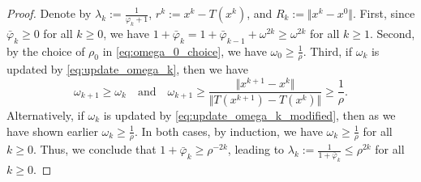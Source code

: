 \documentclass{article}
\theoremstyle{plain}
\theoremstyle{definition}
\newcommand{\norms}[1]{\Vert#1\Vert}
\newcommand{\0}{\boldsymbol{0}}
\begin{document}
\begin{proof}
Denote by $\lambda_k := \frac{1}{\varphi_k + 1}$, $r^k := x^k - T(x^k)$, and $R_k := \norms{x^k - x^0}$.
First, since $\bar{\varphi}_k \geq 0$ for all $k \geq 0$, we have $1 + \bar{\varphi}_k = 1 + \bar{\varphi}_{k-1} + \omega^{2k} \geq \omega^{2k}$ for all $k \geq 1$.
Second, by the choice of $\rho_0$ in \eqref{eq:omega_0_choice}, we have $\omega_0 \geq \frac{1}{\rho}$.
Third, if $\omega_k$ is updated by \eqref{eq:update_omega_k}, then we have 
\begin{equation*}
\omega_{k+1} \geq \omega_k \quad \textrm{and} \quad \omega_{k+1} \geq \frac{\norms{x^{k+1} - x^k } }{ \norms{T(x^{k+1}) - T(x^{k})} } \geq \frac{1}{\rho}.
\end{equation*}
Alternatively, if $\omega_k$ is updated by \eqref{eq:update_omega_k_modified}, then as we have shown earlier $\omega_k \geq \frac{1}{\rho}$.
In both cases, by induction, we have $\omega_k \geq \frac{1}{\rho}$ for all $k \geq 0$.
Thus, we conclude that $1 + \bar{\varphi}_k \geq \rho^{-2k}$, leading to $\lambda_k := \frac{1}{1+ \bar{\varphi}_k} \leq \rho^{2k}$ for all $k \geq 0$.


\end{proof}
\end{document}
